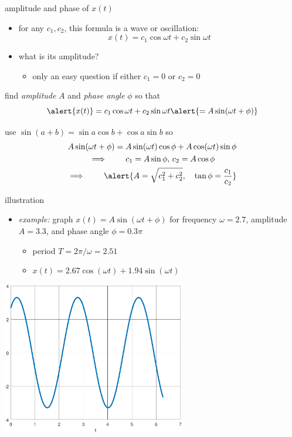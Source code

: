 \documentclass[dvipsnames,colorlinks]{beamer}
\begin{document}
\begin{frame}{amplitude and phase of $x(t)$}

\begin{itemize}
\item for any $c_1,c_2$, this formula is a wave or oscillation:
    $$x(t) = c_1 \cos \omega t + c_2 \sin \omega t$$
\item what is its amplitude?
    \begin{itemize}
    \item only an easy question if either $c_1 =0$ or $c_2=0$
    \end{itemize}
\end{itemize}

 find  \emph{amplitude} $A$ and \emph{phase angle} $\phi$ so that
    $$\alert{x(t)} = c_1 \cos \omega t + c_2 \sin \omega t \alert{= A \sin(\omega t + \phi)}$$

 use $\sin(a+b) = \sin a \cos b + \cos a \sin b$ so
\begin{gather*}
A \sin(\omega t + \phi) = A \sin(\omega t) \cos\phi + A \cos(\omega t) \sin\phi \\
\implies \qquad c_1 = A \sin\phi, \, c_2 = A \cos \phi \\
\implies \qquad \alert{A = \sqrt{c_1^2 + c_2^2}, \quad \tan \phi = \frac{c_1}{c_2}}
\end{gather*}
\end{frame}


\begin{frame}{illustration}

\begin{itemize}
\item \emph{example:} graph $x(t) = A \sin(\omega t + \phi)$ for frequency $\omega=2.7$, amplitude $A=3.3$, and phase angle $\phi=0.3 \pi$
    \begin{itemize}
    \item period $T=2\pi/\omega = 2.51$
    \item $x(t) = 2.67 \cos(\omega t) + 1.94 \sin(\omega t)$
    \end{itemize}
\end{itemize}

\hfill \includegraphics[width=0.6\textwidth]{figs/altwave}
\end{frame}
\end{document}
